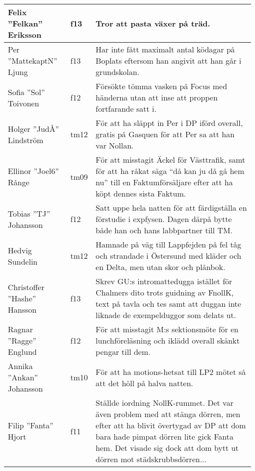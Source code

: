 \begin{longtable}{p{55mm}lp{60mm}}
  Felix ''Felkan'' Eriksson & f13 & Tror att pasta växer på träd. \\ \hline 
  
  Per ''MattekaptN'' Ljung & f13 & Har inte fått maximalt antal ködagar på Boplats eftersom han angivit att han går i grundskolan. \\ \hline 
  
  Sofia ''Sol'' Toivonen & f12 & Försökte tömma vasken på Focus med händerna utan att inse att proppen fortfarande satt i. \\ \hline 
  
  Holger ''JudÅ'' Lindström & tm12 & För att ha släppt in Per i DP iförd overall, gratis på Gasquen för att Per sa att han var Nollan. \\ \hline
  
  Ellinor ''Joel6'' Rånge & tm09 & För att misstagit Äckel för Västtrafik, samt för att ha råkat säga ``då kan ju då gå hem nu'' till en Faktumförsäljare efter att ha köpt dennes sista Faktum.\\ \hline
  
  Tobias ''TJ'' Johansson & f12 & Satt uppe hela natten för att färdigställa en förstudie i expfysen. Dagen därpå bytte både
  han och hans labbpartner till TM.\\ \hline

  Hedvig Sundelin & tm12 & Hamnade på väg till Lappfejden på fel tåg och strandade i Östersund med kläder och en Delta, men utan skor och plånbok.\\ \hline
  
  Christoffer ''Hashe'' Hansson &  f13 & Skrev GU:s intromattedugga istället för Chalmers dito trots guidning av FnollK, text på tavla och tes samt att duggan inte liknade de exempelduggor som delats ut.\\ \hline
    
Ragnar ''Ragge'' Englund &  f12 & För att misstagit M:s sektionsmöte för en lunchföreläsning och 
iklädd overall skänkt pengar till dem. \\ \hline

Annika ''Ankan'' Johansson & tm10 & För att ha motions-hetsat till LP2 mötet så att det höll 
på halva natten.  \\ \hline

Filip ''Fanta'' Hjort & f11 & Ställde  iordning NollK-rummet. Det var även problem med att stänga dörren, men efter att ha blivit övertygad av DP att dom bara hade pimpat dörren lite gick Fanta hem. Det visade sig dock att dom bytt ut dörren mot städskrubbsdörren...\\ \hline


\end{longtable}
